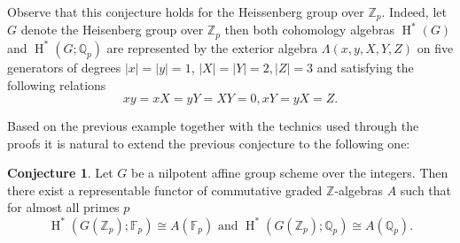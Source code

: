 \documentclass[11pt]{article}
\newcommand{\Z}{\mathbb{Z}}
\newcommand{\Q}{\mathbb{Q}}
\newcommand{\F}{\mathbb{F}}
\newcommand{\Fp}{\mathbb{F}_p}
\newcommand{\Qp}{\mathbb{Q}_p}
\DeclareMathOperator{\HH}{H}
\theoremstyle{plain}
\theoremstyle{definition}
\newtheorem*{Conjecture}{Conjecture}
\begin{document}
Observe that this conjecture holds for the Heissenberg group over $\Z_p$. Indeed, let $G$ denote the Heisenberg group over $\Z_p$ then both cohomology algebras $\HH^*(G)$ and $\HH^*(G;\Q_p)$ are represented by the exterior algebra $\Lambda(x,y,X,Y,Z)$ on five generators of degrees $ |x|=|y|=1$, $|X|=|Y|=2, |Z|=3$ and satisfying the following relations
\[
xy=xX=yY=XY=0, xY=yX=Z.
\]



Based on the previous example together with the technics used through the proofs it is natural to extend the previous conjecture to the following one:

\begin{Conjecture}
	Let $G$  be a nilpotent affine group scheme over the integers. Then there exist a representable functor of commutative graded $\Z$-algebras $A$ such that for almost all primes $p$
	\begin{displaymath}
		\HH^{*}(G(\Z_p);\Fp)\cong A(\F_p) \text{\  and\ } \HH^{*}(G(\Z_p);\Qp)\cong A(\Q_p) .
	\end{displaymath}
\end{Conjecture}






\end{document}
